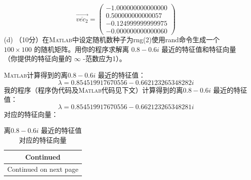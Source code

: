 \documentclass[12pt,a4paper,UTF8]{ctexart}
\begin{document}
\begin{enumerate}
          \begin{equation}
              \overrightarrow{\overline{vec_{2}} }=\left(\begin{array}{c}
                      -1.000000000000000 \\
                      0.500000000000057  \\
                      -0.124999999999975 \\
                      -0.000000000000060
                  \end{array}\right)
          \end{equation}
          (d) （10分）在\textsc{Matlab}中设定随机数种子为rng(2)使用rand命令生成一个 $100 \times 100$ 的随机矩阵。用你的程序求解离 $0.8-0.6 i$ 最近的特征值和特征向量（你提供的特征向量的 $\infty$ -范数应为1）。

          \textsc{Matlab}计算得到的离$0.8-0.6 i$ 最近的特征值：
          \begin{equation}
              \lambda = 0.854519917670556 - 0.662123265348282i
          \end{equation}
          我的程序（程序伪代码及\textsc{Matlab}代码见下文）计算得到的离$0.8-0.6 i$ 最近的特征值：
          \begin{equation}
              \lambda = 0.854519917670556 - 0.662123265348281i
          \end{equation}
          对应的特征向量：

          \begin{longtable}{c}

              \caption{离$0.8-0.6 i$ 最近的特征值对应的特征向量}\label{tab1}


              \endfirsthead

              \multicolumn{1}{c}{Continued}                   \\

              \endhead


              \multicolumn{1}{c}{Continued on next page}
              \endfoot



\end{longtable}
\end{enumerate}
\end{document}
